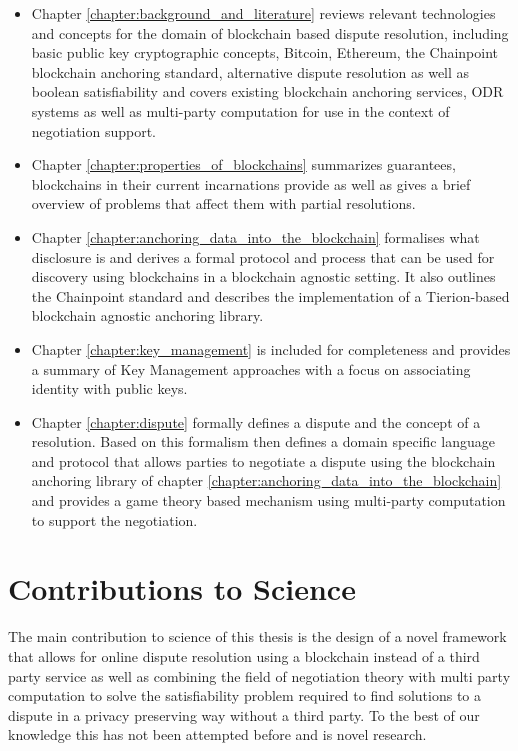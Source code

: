 \documentclass[12pt,msc,a4paper,oneside]{ucl_thesis}
\begin{document}
\begin{itemize}
    \item Chapter \ref{chapter:background_and_literature} reviews relevant technologies and concepts for the domain of blockchain based dispute resolution, including basic public key cryptographic concepts, Bitcoin, Ethereum, the Chainpoint blockchain anchoring standard, alternative dispute resolution as well as boolean satisfiability and covers existing blockchain anchoring services, ODR systems as well as multi-party computation for use in the context of negotiation support.

    \item Chapter \ref{chapter:properties_of_blockchains} summarizes guarantees, blockchains in their current incarnations provide as well as gives a brief overview of problems that affect them with partial resolutions.

    \item Chapter \ref{chapter:anchoring_data_into_the_blockchain} formalises what disclosure is and derives a formal protocol and process that can be used for discovery using blockchains in a blockchain agnostic setting. It also outlines the Chainpoint standard and describes the implementation of a Tierion-based blockchain agnostic anchoring library.

    \item Chapter \ref{chapter:key_management} is included for completeness and provides a summary of Key Management approaches with a focus on associating identity with public keys.

    \item Chapter \ref{chapter:dispute} formally defines a dispute and the concept of a resolution. Based on this formalism then defines a domain specific language and protocol that allows parties to negotiate a dispute using the blockchain anchoring library of chapter \ref{chapter:anchoring_data_into_the_blockchain} and provides a game theory based mechanism using multi-party computation to support the negotiation.
\end{itemize}


\section{Contributions to Science}
The main contribution to science of this thesis is the design of a novel framework that allows for online dispute resolution using a blockchain instead of a third party service as well as combining the field of negotiation theory with multi party computation to solve the satisfiability problem required to find solutions to a dispute in a privacy preserving way without a third party. To the best of our knowledge this has not been attempted before and is novel research.
\end{document}
